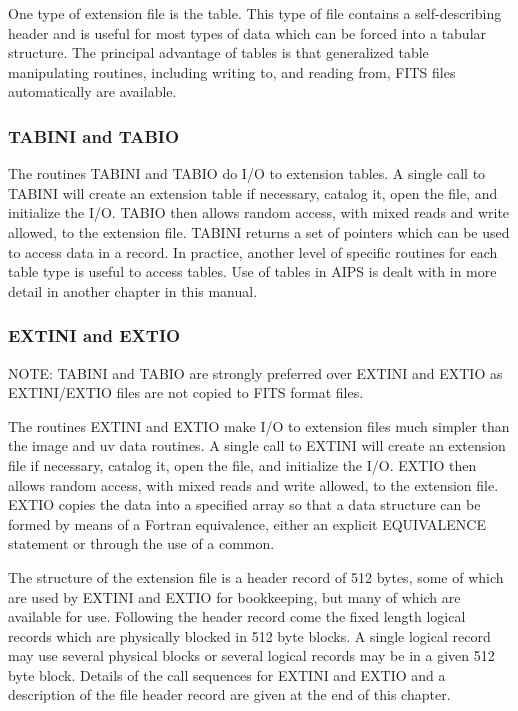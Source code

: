 One type of extension file is the table.  This type of file contains a
self-describing header and is useful for most types of data which can
be forced into a tabular structure.  The principal advantage of tables
is that generalized table manipulating routines, including writing
to, and reading from, FITS files automatically are available.

\subsubsection{TABINI and TABIO}
The routines TABINI and TABIO do I/O to extension tables. A single
call to TABINI will create an extension table if necessary, catalog
it, open the file, and initialize the I/O.  TABIO then allows random
access, with mixed reads and write allowed, to the extension file.
TABINI returns a set of pointers which can be used to access data in a
record.  In practice, another level of specific routines for each
table type is useful to access tables.  Use of tables in AIPS is dealt
with in more detail in another chapter in this manual.
\subsubsection{EXTINI and EXTIO}

NOTE: TABINI and TABIO are strongly preferred over EXTINI and EXTIO as
EXTINI/EXTIO files are not copied to FITS format files.

The routines EXTINI and EXTIO make I/O to extension files much
simpler than the image and uv data routines.  A single call to EXTINI
will create an extension file if necessary, catalog it, open the file,
and initialize the I/O.  EXTIO then allows random access, with mixed
reads and write allowed, to the extension file.  EXTIO copies the
data into a specified array so that a data structure can be formed by
means of a Fortran equivalence, either an explicit EQUIVALENCE
statement or through the use of a common.

The structure of the extension file is a header record of 512 bytes,
some of which are used by EXTINI and EXTIO for bookkeeping, but many
of which are available for use.  Following the header record come the
fixed length logical records which are physically blocked in 512 byte
blocks.  A single logical record may use several physical blocks or
several logical records may be in a given 512 byte block.  Details of
the call sequences for EXTINI and EXTIO and a description of the
file header record are given at the end of this chapter.

